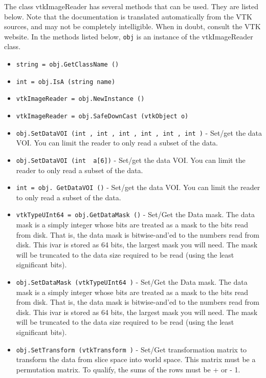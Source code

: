 The class vtkImageReader has several methods that can be used.
  They are listed below.
Note that the documentation is translated automatically from the VTK sources,
and may not be completely intelligible.  When in doubt, consult the VTK website.
In the methods listed below, \verb|obj| is an instance of the vtkImageReader class.
\begin{itemize}
\item  \verb|string = obj.GetClassName ()|

\item  \verb|int = obj.IsA (string name)|

\item  \verb|vtkImageReader = obj.NewInstance ()|

\item  \verb|vtkImageReader = obj.SafeDownCast (vtkObject o)|

\item  \verb|obj.SetDataVOI (int , int , int , int , int , int )| -  Set/get the data VOI. You can limit the reader to only
 read a subset of the data. 

\item  \verb|obj.SetDataVOI (int  a[6])| -  Set/get the data VOI. You can limit the reader to only
 read a subset of the data. 

\item  \verb|int = obj. GetDataVOI ()| -  Set/get the data VOI. You can limit the reader to only
 read a subset of the data. 

\item  \verb|vtkTypeUInt64 = obj.GetDataMask ()| -  Set/Get the Data mask.  The data mask is a simply integer whose bits are
 treated as a mask to the bits read from disk.  That is, the data mask is
 bitwise-and'ed to the numbers read from disk.  This ivar is stored as 64
 bits, the largest mask you will need.  The mask will be truncated to the
 data size required to be read (using the least significant bits).

\item  \verb|obj.SetDataMask (vtkTypeUInt64 )| -  Set/Get the Data mask.  The data mask is a simply integer whose bits are
 treated as a mask to the bits read from disk.  That is, the data mask is
 bitwise-and'ed to the numbers read from disk.  This ivar is stored as 64
 bits, the largest mask you will need.  The mask will be truncated to the
 data size required to be read (using the least significant bits).

\item  \verb|obj.SetTransform (vtkTransform )| -  Set/Get transformation matrix to transform the data from slice space
 into world space. This matrix must be a permutation matrix. To qualify,
 the sums of the rows must be + or - 1.


\end{itemize}
